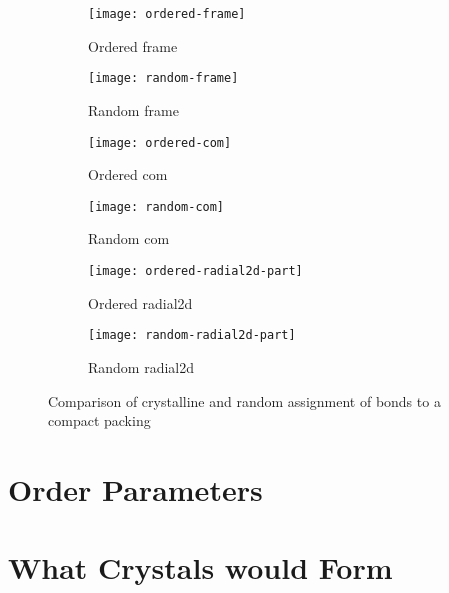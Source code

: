 \begin{figure}
    \begin{subfigure}{0.5\textwidth}
        \texttt{[image: ordered-frame]}
        \caption{Ordered frame}
        \label{fig:ordered frame}
    \end{subfigure}
    \begin{subfigure}{0.5\textwidth}
        \texttt{[image: random-frame]}
        \caption{Random frame}
        \label{fig:random frame}
    \end{subfigure}
    \begin{subfigure}{0.5\textwidth}
        \texttt{[image: ordered-com]}
        \caption{Ordered com}
        \label{fig:ordered com}
    \end{subfigure}
    \begin{subfigure}{0.5\textwidth}
        \texttt{[image: random-com]}
        \caption{Random com}
        \label{fig:random com}
    \end{subfigure}
    \begin{subfigure}{0.5\textwidth}
        \texttt{[image: ordered-radial2d-part]}
        \caption{Ordered radial2d}
        \label{fig:ordered radial2d}
    \end{subfigure}
    \begin{subfigure}{0.5\textwidth}
        \texttt{[image: random-radial2d-part]}
        \caption{Random radial2d}
        \label{fig:random radial2d}
    \end{subfigure}
    \caption{Comparison of crystalline and random assignment of bonds to a compact packing}
    \label{fig:compact bonds}
\end{figure}


\section{Order Parameters}

\section{What Crystals would Form}

